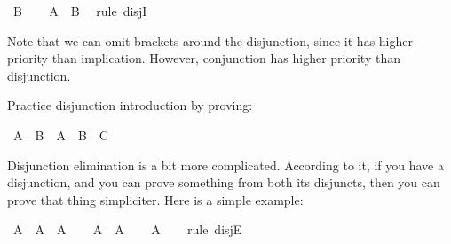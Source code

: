\begin{isabellebody}
\ {\isachardoublequoteopen}B{\isachardoublequoteclose}\isanewline
\ \ \isamarkupfalse%
\ {\isachardoublequoteopen}A\ {\isasymor}\ B{\isachardoublequoteclose}\ \isamarkupfalse%
\ {\isacharparenleft}rule\ disjI{}{\isacharparenright}\isanewline
{}\isamarkupfalse%
%
\endisatagproof
{\isafoldproof}%
%
\isadelimproof
%
\endisadelimproof
%
\begin{isamarkuptext}%
Note that we can omit brackets around the disjunction, since it has higher priority than
implication. However, conjunction has higher priority than disjunction.%
\end{isamarkuptext}\isamarkuptrue%
%
\begin{isamarkuptext}%
\begin{Exercise} Practice disjunction introduction by proving: \end{Exercise}%
\end{isamarkuptext}\isamarkuptrue%
\isamarkupfalse%
\ {\isachardoublequoteopen}{\isacharparenleft}A\ {\isasymlongrightarrow}\ B{\isacharparenright}\ {\isasymlongrightarrow}\ {\isacharparenleft}A\ {\isasymlongrightarrow}\ B\ {\isasymor}\ C{\isacharparenright}{\isachardoublequoteclose}%
\isadelimproof
\ %
\endisadelimproof
%
\isatagproof
{}\isamarkupfalse%
%
\endisatagproof
{\isafoldproof}%
%
\isadelimproof
%
\endisadelimproof
%
\isadelimdocument
%
\endisadelimdocument
%
\isatagdocument
%
\isamarkuptrue%
%
\endisatagdocument
{\isafolddocument}%
%
\isadelimdocument
%
\endisadelimdocument
%
\begin{isamarkuptext}%
Disjunction elimination is a bit more complicated. According to it, if you have a disjunction,
and you can prove something from both its disjuncts, then you can prove that thing simpliciter.
Here is a simple example:%
\end{isamarkuptext}\isamarkuptrue%
\isamarkupfalse%
\ {\isachardoublequoteopen}A\ {\isasymor}\ A\ {\isasymlongrightarrow}\ A{\isachardoublequoteclose}\isanewline
%
\isadelimproof
%
\endisadelimproof
%
\isatagproof
{}\isamarkupfalse%
\isanewline
\ \ \isamarkupfalse%
\ {\isachardoublequoteopen}A\ {\isasymor}\ A{\isachardoublequoteclose}\isanewline
\ \ \isamarkupfalse%
\ {\isachardoublequoteopen}A{\isachardoublequoteclose}\isanewline
\ \ \isamarkupfalse%
\ {\isacharparenleft}rule\ disjE{\isacharparenright}\isanewline
\ \ \ \ \isamarkupfalse%

\end{isabellebody}
